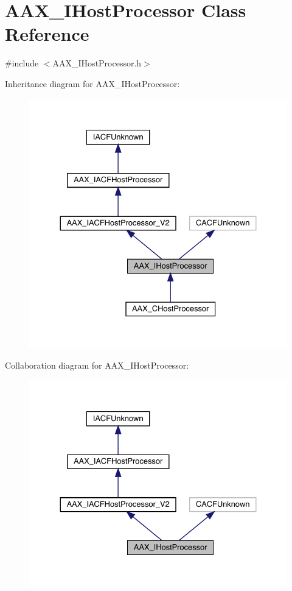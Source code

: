 \hypertarget{a01833}{}\section{A\+A\+X\+\_\+\+I\+Host\+Processor Class Reference}
\label{a01833}


{\ttfamily \#include $<$A\+A\+X\+\_\+\+I\+Host\+Processor.\+h$>$}



Inheritance diagram for A\+A\+X\+\_\+\+I\+Host\+Processor\+:
\nopagebreak
\begin{figure}[H]
\begin{center}
\leavevmode
\includegraphics[width=330pt]{a01832}
\end{center}
\end{figure}


Collaboration diagram for A\+A\+X\+\_\+\+I\+Host\+Processor\+:
\nopagebreak
\begin{figure}[H]
\begin{center}
\leavevmode
\includegraphics[width=330pt]{a01831}
\end{center}
\end{figure}


